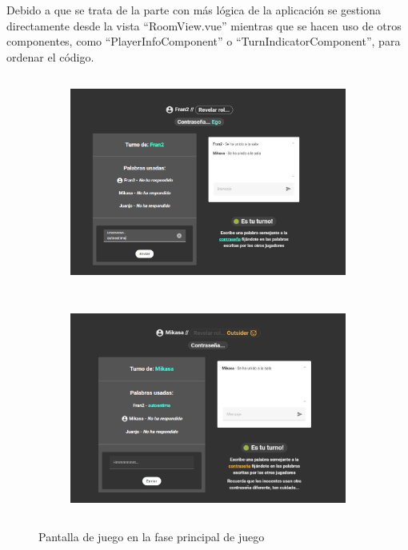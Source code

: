 Debido a que se trata de la parte con más lógica de la aplicación se gestiona directamente desde la vista ``RoomView.vue'' mientras
que se hacen uso de otros componentes, como ``PlayerInfoComponent'' o ``TurnIndicatorComponent'', para ordenar el código.

\begin{figure}[h]													
	\begin{subfigure}{\textwidth}
		\centering
		\includegraphics[height=7cm]{res_juego1.png}
	\end{subfigure}
																																																																																																																																																																													
	\begin{subfigure}{\textwidth}
		\centering
		\includegraphics[height=7cm]{res_juego2.png} 
	\end{subfigure}																																																																																																																																																																														
	\caption{Pantalla de juego en la fase principal de juego}
	\label{fig:res_juego}										
\end{figure}


